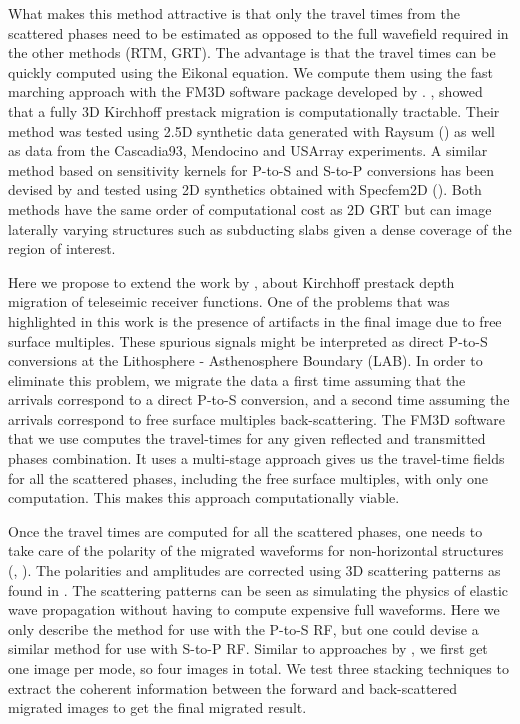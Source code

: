 \documentclass[10pt,a4paper]{article}
\numberwithin{equation}{section}
\begin{document}
What makes this method attractive is that only the travel times from the scattered phases need to be estimated as opposed to the full wavefield required in the other methods (RTM, GRT).
The advantage is that the travel times can be quickly computed using the Eikonal equation.
We compute them using the fast marching approach with the FM3D software package developed by \cite{deko_gji_06}.
\cite{cheng_gji_16}, \cite{cheng_grl_17} showed that a fully 3D Kirchhoff prestack migration is computationally tractable.
Their method was tested using 2.5D synthetic data generated with Raysum (\cite{fred_gji_00}) as well as data from the Cascadia93, Mendocino and USArray experiments.
A similar method based on sensitivity kernels for P-to-S and S-to-P conversions has been devised by \cite{hans_ggg_17} and tested using 2D synthetics obtained with Specfem2D (\cite{trom_ccp_08}).
Both methods have the same order of computational cost as 2D GRT but can image laterally varying structures such as subducting slabs given a dense coverage of the region of interest.

Here we propose to extend the work by \cite{cheng_gji_16}, about Kirchhoff prestack depth migration of teleseimic receiver functions.
One of the problems that was highlighted in this work is the presence of artifacts in the final image due to free surface multiples.
These spurious signals might be interpreted as direct P-to-S conversions at the Lithosphere - Asthenosphere Boundary (LAB).
In order to eliminate this problem, we migrate the data a first time assuming that the arrivals correspond to a direct P-to-S conversion, and a second time assuming the arrivals correspond to free surface multiples back-scattering.
The FM3D software that we use computes the travel-times for any given reflected and transmitted phases combination.
It uses a multi-stage approach gives us the travel-time fields for all the scattered phases, including the free surface multiples, with only one computation.
This makes this approach computationally viable.

Once the travel times are computed for all the scattered phases, one needs to take care of the polarity of the migrated waveforms for non-horizontal structures (\cite{tone_epsl_08}, \cite{cheng_gji_16}).
The polarities and amplitudes are corrected using 3D scattering patterns as found in \cite{beyl_wamo_90}.
The scattering patterns can be seen as simulating the physics of elastic wave propagation without having to compute expensive full waveforms.
Here we only describe the method for use with the P-to-S RF, but one could devise a similar method for use with S-to-P RF.
Similar to approaches by \cite{rond_sgeo_09}, we first get one image per mode, so four images in total.
We test three stacking techniques to extract the coherent information between the forward and back-scattered migrated images to get the final migrated result.
\end{document}
